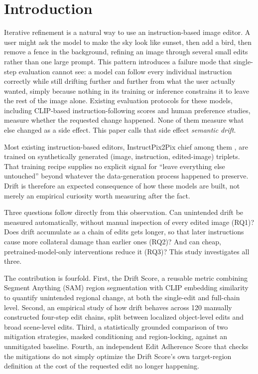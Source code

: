 \vspace{-16pt}
\section{Introduction}
Iterative refinement is a natural way to use an instruction-based image editor. A user might ask the model to make the sky look like sunset, then add a bird, then remove a fence in the background, refining an image through several small edits rather than one large prompt. This pattern introduces a failure mode that single-step evaluation cannot see: a model can follow every individual instruction correctly while still drifting further and further from what the user actually wanted, simply because nothing in its training or inference constrains it to leave the rest of the image alone. Existing evaluation protocols for these models, including CLIP-based instruction-following scores and human preference studies, measure whether the requested change happened. None of them measure what else changed as a side effect. This paper calls that side effect \textit{semantic drift}.

Most existing instruction-based editors, InstructPix2Pix chief among them \cite{ref_ip2p}, are trained on synthetically generated (image, instruction, edited-image) triplets. That training recipe supplies no explicit signal for ``leave everything else untouched'' beyond whatever the data-generation process happened to preserve. Drift is therefore an expected consequence of how these models are built, not merely an empirical curiosity worth measuring after the fact.

Three questions follow directly from this observation. Can unintended drift be measured automatically, without manual inspection of every edited image (RQ1)? Does drift accumulate as a chain of edits gets longer, so that later instructions cause more collateral damage than earlier ones (RQ2)? And can cheap, pretrained-model-only interventions reduce it (RQ3)? This study investigates all three.

The contribution is fourfold. First, the Drift Score, a reusable metric combining Segment Anything (SAM) region segmentation with CLIP embedding similarity to quantify unintended regional change, at both the single-edit and full-chain level. Second, an empirical study of how drift behaves across 120 manually constructed four-step edit chains, split between localized object-level edits and broad scene-level edits. Third, a statistically grounded comparison of two mitigation strategies, masked conditioning and region-locking, against an unmitigated baseline. Fourth, an independent Edit Adherence Score that checks the mitigations do not simply optimize the Drift Score's own target-region definition at the cost of the requested edit no longer happening.

